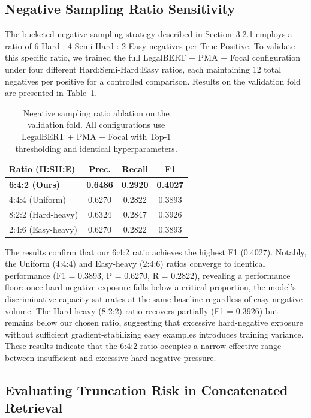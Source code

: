 \documentclass[sigconf]{acmart}
\newcommand{\rev}[1]{{\color{blue}#1}}
\begin{document}
\rev{\subsection{Negative Sampling Ratio Sensitivity}

The bucketed negative sampling strategy described in Section~3.2.1 employs a ratio of 6 Hard : 4 Semi-Hard : 2 Easy negatives per True Positive. To validate this specific ratio, we trained the full LegalBERT + PMA + Focal configuration under four different Hard:Semi-Hard:Easy ratios, each maintaining 12 total negatives per positive for a controlled comparison. Results on the validation fold are presented in Table~\ref{tab:neg_ratio}.

\begin{table}[h]
  \caption{Negative sampling ratio ablation on the validation fold. All configurations use LegalBERT + PMA + Focal with Top-1 thresholding and identical hyperparameters.}
  \label{tab:neg_ratio}
  \begin{tabular}{@{}l c c c@{}}
    \toprule
    \textbf{Ratio (H:SH:E)} & \textbf{Prec.} & \textbf{Recall} & \textbf{F1} \\
    \midrule
    \textbf{6:4:2 (Ours)} & \textbf{0.6486} & \textbf{0.2920} & \textbf{0.4027} \\
    4:4:4 (Uniform) & 0.6270 & 0.2822 & 0.3893 \\
    8:2:2 (Hard-heavy) & 0.6324 & 0.2847 & 0.3926 \\
    2:4:6 (Easy-heavy) & 0.6270 & 0.2822 & 0.3893 \\
    \bottomrule
  \end{tabular}
\end{table}

The results confirm that our 6:4:2 ratio achieves the highest F1 (0.4027). Notably, the Uniform (4:4:4) and Easy-heavy (2:4:6) ratios converge to identical performance (F1 = 0.3893, P = 0.6270, R = 0.2822), revealing a performance floor: once hard-negative exposure falls below a critical proportion, the model's discriminative capacity saturates at the same baseline regardless of easy-negative volume. The Hard-heavy (8:2:2) ratio recovers partially (F1 = 0.3926) but remains below our chosen ratio, suggesting that excessive hard-negative exposure without sufficient gradient-stabilizing easy examples introduces training variance. These results indicate that the 6:4:2 ratio occupies a narrow effective range between insufficient and excessive hard-negative pressure.}

\subsection{Evaluating Truncation Risk in Concatenated Retrieval}
\end{document}
